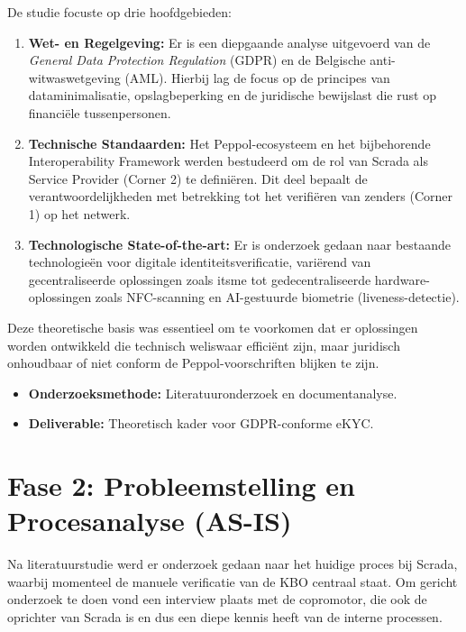 De studie focuste op drie hoofdgebieden:
\begin{enumerate}
\item \textbf{Wet- en Regelgeving:} Er is een diepgaande analyse uitgevoerd van de \textit{General Data Protection Regulation} (GDPR) en de Belgische anti-witwaswetgeving (AML). Hierbij lag de focus op de principes van dataminimalisatie, opslagbeperking en de juridische bewijslast die rust op financiële tussenpersonen.
\item \textbf{Technische Standaarden:} Het Peppol-ecosysteem en het bijbehorende Interoperability Framework werden bestudeerd om de rol van Scrada als Service Provider (Corner 2) te definiëren. Dit deel bepaalt de verantwoordelijkheden met betrekking tot het verifiëren van zenders (Corner 1) op het netwerk.
\item \textbf{Technologische State-of-the-art:} Er is onderzoek gedaan naar bestaande technologieën voor digitale identiteitsverificatie, variërend van gecentraliseerde oplossingen zoals itsme tot gedecentraliseerde hardware-oplossingen zoals NFC-scanning en AI-gestuurde biometrie (liveness-detectie).
\end{enumerate}

Deze theoretische basis was essentieel om te voorkomen dat er oplossingen worden ontwikkeld die technisch weliswaar efficiënt zijn, maar juridisch onhoudbaar of niet conform de Peppol-voorschriften blijken te zijn.
\begin{itemize}
\item \textbf{Onderzoeksmethode:} Literatuuronderzoek en documentanalyse.
\item \textbf{Deliverable:} Theoretisch kader voor GDPR-conforme eKYC.
\end{itemize}

\section{Fase 2: Probleemstelling en Procesanalyse (AS-IS)}
Na literatuurstudie werd er onderzoek gedaan naar het huidige proces bij Scrada, waarbij momenteel de manuele verificatie van de KBO centraal staat.
Om gericht onderzoek te doen vond een interview plaats met de copromotor, die ook de oprichter van Scrada is en dus een diepe kennis heeft van de interne processen.

